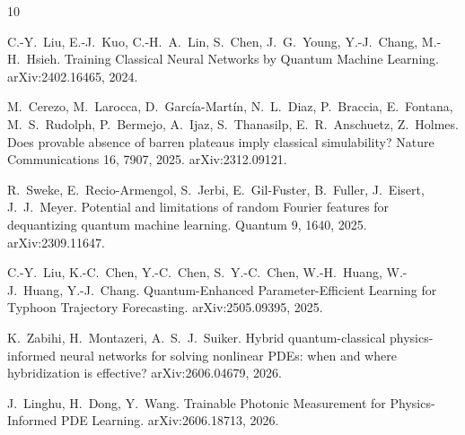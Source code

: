 \documentclass[10pt,a4paper]{article}
\begin{document}
\begin{thebibliography}{10}
\footnotesize

C.-Y.\ Liu, E.-J.\ Kuo, C.-H.\ A.\ Lin, S.\ Chen, J.\ G.\ Young, Y.-J.\ Chang, M.-H.\ Hsieh.
\newblock Training Classical Neural Networks by Quantum Machine Learning.
\newblock arXiv:2402.16465, 2024.

M.\ Cerezo, M.\ Larocca, D.\ Garc\'ia-Mart\'in, N.\ L.\ Diaz, P.\ Braccia, E.\ Fontana, M.\ S.\ Rudolph, P.\ Bermejo, A.\ Ijaz, S.\ Thanasilp, E.\ R.\ Anschuetz, Z.\ Holmes.
\newblock Does provable absence of barren plateaus imply classical simulability?
\newblock Nature Communications 16, 7907, 2025. arXiv:2312.09121.

R.\ Sweke, E.\ Recio-Armengol, S.\ Jerbi, E.\ Gil-Fuster, B.\ Fuller, J.\ Eisert, J.\ J.\ Meyer.
\newblock Potential and limitations of random Fourier features for dequantizing quantum machine learning.
\newblock Quantum 9, 1640, 2025. arXiv:2309.11647.

C.-Y.\ Liu, K.-C.\ Chen, Y.-C.\ Chen, S.\ Y.-C.\ Chen, W.-H.\ Huang, W.-J.\ Huang, Y.-J.\ Chang.
\newblock Quantum-Enhanced Parameter-Efficient Learning for Typhoon Trajectory Forecasting.
\newblock arXiv:2505.09395, 2025.

K.\ Zabihi, H.\ Montazeri, A.\ S.\ J.\ Suiker.
\newblock Hybrid quantum-classical physics-informed neural networks for solving nonlinear PDEs: when and where hybridization is effective?
\newblock arXiv:2606.04679, 2026.

J.\ Linghu, H.\ Dong, Y.\ Wang.
\newblock Trainable Photonic Measurement for Physics-Informed PDE Learning.
\newblock arXiv:2606.18713, 2026.

\end{thebibliography}
\end{document}
